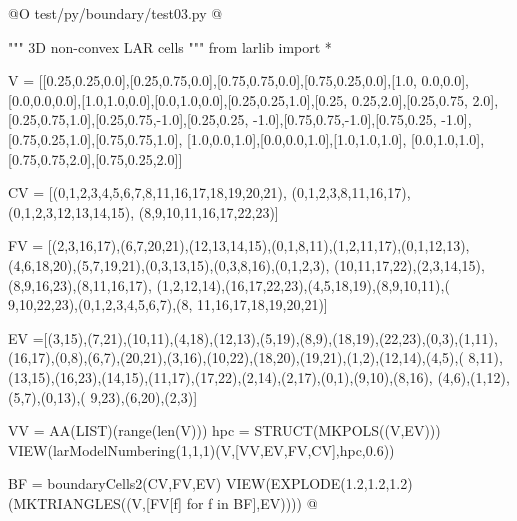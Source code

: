 \documentclass[11pt,oneside]{article}	%
\begin{document}
@O test/py/boundary/test03.py
@{""" 3D non-convex LAR cells """
from larlib import *

V = [[0.25,0.25,0.0],[0.25,0.75,0.0],[0.75,0.75,0.0],[0.75,0.25,0.0],[1.0, 0.0,0.0],
[0.0,0.0,0.0],[1.0,1.0,0.0],[0.0,1.0,0.0],[0.25,0.25,1.0],[0.25, 0.25,2.0],[0.25,0.75,
2.0],[0.25,0.75,1.0],[0.25,0.75,-1.0],[0.25,0.25, -1.0],[0.75,0.75,-1.0],[0.75,0.25,
-1.0],[0.75,0.25,1.0],[0.75,0.75,1.0], [1.0,0.0,1.0],[0.0,0.0,1.0],[1.0,1.0,1.0],
[0.0,1.0,1.0],[0.75,0.75,2.0],[0.75,0.25,2.0]]

CV = [(0,1,2,3,4,5,6,7,8,11,16,17,18,19,20,21), (0,1,2,3,8,11,16,17),
(0,1,2,3,12,13,14,15), (8,9,10,11,16,17,22,23)]

FV = [(2,3,16,17),(6,7,20,21),(12,13,14,15),(0,1,8,11),(1,2,11,17),(0,1,12,13),
(4,6,18,20),(5,7,19,21),(0,3,13,15),(0,3,8,16),(0,1,2,3),
(10,11,17,22),(2,3,14,15),(8,9,16,23),(8,11,16,17),
(1,2,12,14),(16,17,22,23),(4,5,18,19),(8,9,10,11),(
9,10,22,23),(0,1,2,3,4,5,6,7),(8, 11,16,17,18,19,20,21)]

EV =[(3,15),(7,21),(10,11),(4,18),(12,13),(5,19),(8,9),(18,19),(22,23),(0,3),(1,11),
(16,17),(0,8),(6,7),(20,21),(3,16),(10,22),(18,20),(19,21),(1,2),(12,14),(4,5),(
8,11),(13,15),(16,23),(14,15),(11,17),(17,22),(2,14),(2,17),(0,1),(9,10),(8,16),
(4,6),(1,12),(5,7),(0,13),( 9,23),(6,20),(2,3)]

VV = AA(LIST)(range(len(V)))
hpc = STRUCT(MKPOLS((V,EV)))
VIEW(larModelNumbering(1,1,1)(V,[VV,EV,FV,CV],hpc,0.6))

BF = boundaryCells2(CV,FV,EV)
VIEW(EXPLODE(1.2,1.2,1.2)(MKTRIANGLES((V,[FV[f] for f in BF],EV))))
@}
\end{document}
